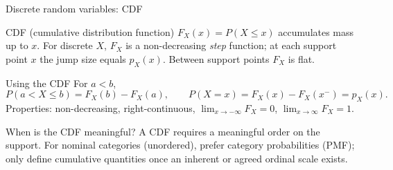 \documentclass{beamer}
\def\P{P}%
\def\mathbb#1{#1}%
\renewcommand{\P}{\mathbb{P}}
\newcommand{\1}{\mathbf{1}}
\begin{document}
\begin{frame}{Discrete random variables: CDF}{}
  {\small
    \begin{block}{CDF (cumulative distribution function)}
      $F_X(x)=\P(X\le x)$ accumulates mass up to $x$. For discrete $X$, $F_X$ is a non-decreasing \emph{step} function; at each support point $x$ the jump size equals $p_X(x)$. Between support points $F_X$ is flat.
    \end{block}
    \vspace{-0.4em}
    \begin{exampleblock}{Using the CDF}
      For $a<b$,
      {\scriptsize\[
          \P(a< X\le b)=F_X(b)-F_X(a),\qquad \P(X=x)=F_X(x)-F_X(x^-)=p_X(x).
      \]}
      Properties: non-decreasing, right-continuous, $\lim_{x\to-\infty}F_X=0$, $\lim_{x\to\infty}F_X=1$.
    \end{exampleblock}
    \vspace{-0.45em}
    \begin{alertblock}{When is the CDF meaningful?}
      A CDF requires a meaningful order on the support. For nominal categories (unordered), prefer category probabilities (PMF); only define cumulative quantities once an inherent or agreed ordinal scale exists.
    \end{alertblock}
  }
\end{frame}
\end{document}
